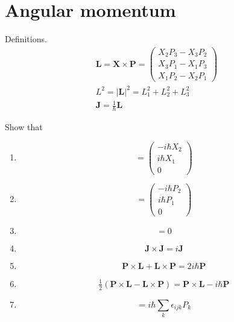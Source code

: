 

\section*{Angular momentum}

Definitions.
\begin{gather*}
\mathbf L=\mathbf X\times\mathbf P
=\begin{pmatrix}
X_2P_3-X_3P_2
\\
X_3P_1-X_1P_3
\\
X_1P_2-X_2P_1
\end{pmatrix}
\\[1ex]
L^2=|\mathbf L|^2=L_1^2+L_2^2+L_3^2
\\[1ex]
\mathbf J=\frac{1}{\hbar}\mathbf L
\end{gather*}

Show that

\begin{enumerate}

\item
\begin{equation*}
[\mathbf X,L_3]
=\begin{pmatrix}
-i\hbar X_2
\\
i\hbar X_1
\\
0
\end{pmatrix}
\end{equation*}

\item
\begin{equation*}
[\mathbf P,L_3]
=\begin{pmatrix}
-i\hbar P_2
\\
i\hbar P_1
\\
0
\end{pmatrix}
\end{equation*}

\item
\begin{equation*}
[\mathbf L,L^2]=0
\end{equation*}

\item
\begin{equation*}
\mathbf J\times\mathbf J=i\mathbf J
\end{equation*}

\item
\begin{equation*}
\mathbf P\times\mathbf L+\mathbf L\times\mathbf P=2i\hbar\mathbf P
\end{equation*}

\item
\begin{equation*}
\tfrac{1}{2}\left(\mathbf P\times\mathbf L-\mathbf L\times\mathbf P\right)
=\mathbf P\times\mathbf L-i\hbar\mathbf P
\end{equation*}

\item
\begin{equation*}
[L_i,P_j]=i\hbar\sum_k\epsilon_{ijk}P_k
\end{equation*}

\end{enumerate}



